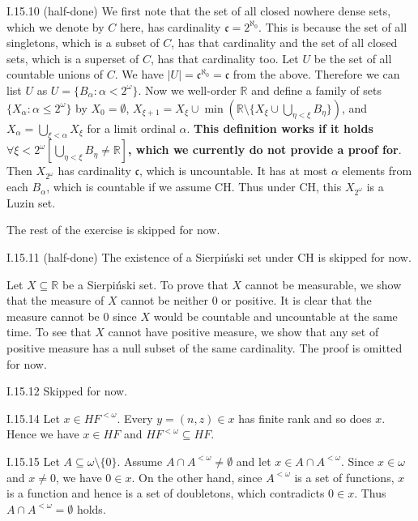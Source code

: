 \documentclass[12pt]{article}
\begin{document}
\begin{customthm}{I.15.10} (half-done)
  We first note that the set of all closed nowhere dense sets, which we denote by $C$ here, has cardinality $\mathfrak{c}=2^{\aleph_0}$. This is because the set of all singletons, which is a subset of $C$, has that cardinality and the set of all closed sets, which is a superset of $C$, has that cardinality too. Let $U$ be the set of all countable unions of $C$. We have $|U|=\mathfrak{c}^{\aleph_0}=\mathfrak{c}$ from the above. Therefore we can list $U$ as $U=\{B_\alpha:\alpha<2^{\omega}\}$. Now we well-order $\mathbb{R}$ and define a family of sets $\{X_\alpha:\alpha\leq2^{\omega}\}$ by $X_0=\emptyset$, $X_{\xi+1}=X_\xi\cup\min(\mathbb{R}\setminus\{X_\xi\cup\bigcup_{\eta<\xi}B_\eta\})$, and $X_{\alpha}=\bigcup_{\xi<\alpha}X_\xi$ for a limit ordinal $\alpha$. \textbf{This definition works if it holds $\forall\xi<2^\omega[\bigcup_{\eta<\xi}B_\eta\neq\mathbb{R}]$, which we currently do not provide a proof for}. Then $X_{2^\omega}$ has cardinality $\mathfrak{c}$, which is uncountable. It has at most $\alpha$ elements from each $B_\alpha$, which is countable if we assume CH. Thus under CH, this $X_{2^\omega}$ is a Luzin set.

  The rest of the exercise is skipped for now.
\end{customthm}

\begin{customthm}{I.15.11} (half-done)
  The existence of a Sierpiński set under CH is skipped for now.

  Let $X\subseteq\mathbb{R}$ be a Sierpiński set. To prove that $X$ cannot be measurable, we show that the measure of $X$ cannot be neither $0$ or positive. It is clear that the measure cannot be 0 since $X$ would be countable and uncountable at the same time. To see that $X$ cannot have positive measure, we show that any set of positive measure has a null subset of the same cardinality. The proof is omitted for now.
\end{customthm}

\begin{customthm}{I.15.12}
  Skipped for now.
\end{customthm}

\begin{customthm}{I.15.14}
  Let $x\in HF^{<\omega}$. Every $y=(n,z)\in x$ has finite rank and so does $x$. Hence we have $x\in HF$ and $HF^{<\omega}\subseteq HF$.
\end{customthm}

\begin{customthm}{I.15.15}
  Let $A\subseteq\omega\setminus\{0\}$. Assume $A\cap A^{<\omega}\neq\emptyset$ and let $x\in A\cap A^{<\omega}$. Since $x\in\omega$ and $x\neq 0$, we have $0\in x$. On the other hand, since $A^{<\omega}$ is a set of functions, $x$ is a function and hence is a set of doubletons, which contradicts $0\in x$. Thus $A\cap A^{<\omega}=\emptyset$ holds.
\end{customthm}
\end{document}
